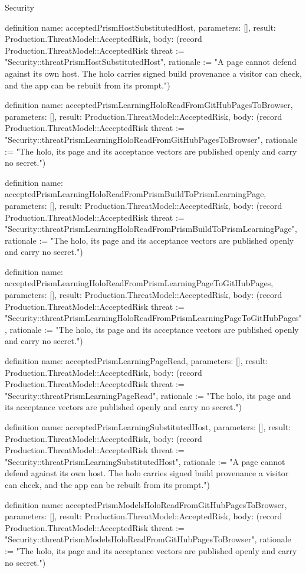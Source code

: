 \begin{lexlean}{Security}
\begin{semanticmodule}
definition{
  name: acceptedPrismHostSubstitutedHost,
  parameters: [],
  result: Production.ThreatModel::AcceptedRisk,
  body: (record Production.ThreatModel::AcceptedRisk {threat := "Security::threatPrismHostSubstitutedHost", rationale := "A page cannot defend against its own host. The holo carries signed build provenance a visitor can check, and the app can be rebuilt from its prompt."})
}

definition{
  name: acceptedPrismLearningHoloReadFromGitHubPagesToBrowser,
  parameters: [],
  result: Production.ThreatModel::AcceptedRisk,
  body: (record Production.ThreatModel::AcceptedRisk {threat := "Security::threatPrismLearningHoloReadFromGitHubPagesToBrowser", rationale := "The holo, its page and its acceptance vectors are published openly and carry no secret."})
}

definition{
  name: acceptedPrismLearningHoloReadFromPrismBuildToPrismLearningPage,
  parameters: [],
  result: Production.ThreatModel::AcceptedRisk,
  body: (record Production.ThreatModel::AcceptedRisk {threat := "Security::threatPrismLearningHoloReadFromPrismBuildToPrismLearningPage", rationale := "The holo, its page and its acceptance vectors are published openly and carry no secret."})
}

definition{
  name: acceptedPrismLearningHoloReadFromPrismLearningPageToGitHubPages,
  parameters: [],
  result: Production.ThreatModel::AcceptedRisk,
  body: (record Production.ThreatModel::AcceptedRisk {threat := "Security::threatPrismLearningHoloReadFromPrismLearningPageToGitHubPages", rationale := "The holo, its page and its acceptance vectors are published openly and carry no secret."})
}

definition{
  name: acceptedPrismLearningPageRead,
  parameters: [],
  result: Production.ThreatModel::AcceptedRisk,
  body: (record Production.ThreatModel::AcceptedRisk {threat := "Security::threatPrismLearningPageRead", rationale := "The holo, its page and its acceptance vectors are published openly and carry no secret."})
}

definition{
  name: acceptedPrismLearningSubstitutedHost,
  parameters: [],
  result: Production.ThreatModel::AcceptedRisk,
  body: (record Production.ThreatModel::AcceptedRisk {threat := "Security::threatPrismLearningSubstitutedHost", rationale := "A page cannot defend against its own host. The holo carries signed build provenance a visitor can check, and the app can be rebuilt from its prompt."})
}

definition{
  name: acceptedPrismModelsHoloReadFromGitHubPagesToBrowser,
  parameters: [],
  result: Production.ThreatModel::AcceptedRisk,
  body: (record Production.ThreatModel::AcceptedRisk {threat := "Security::threatPrismModelsHoloReadFromGitHubPagesToBrowser", rationale := "The holo, its page and its acceptance vectors are published openly and carry no secret."})
}


\end{semanticmodule}
\end{lexlean}

